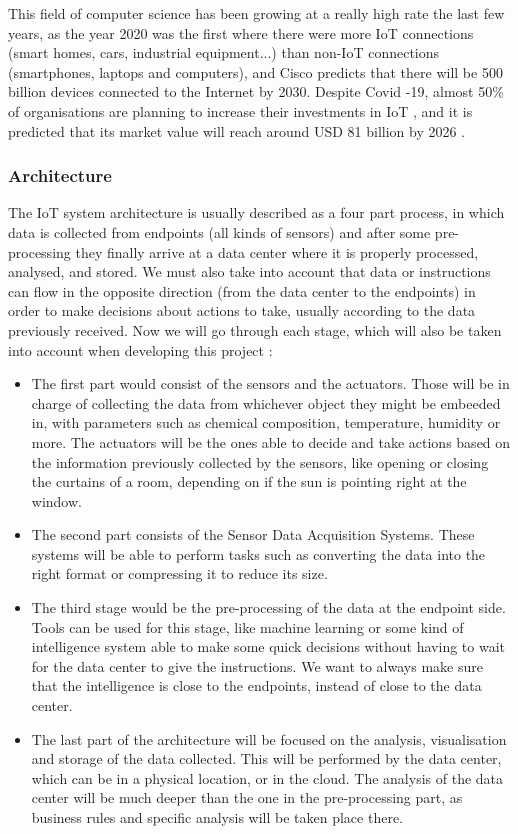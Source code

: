 \documentclass[12pt]{article}
\begin{document}
This field of computer science has been growing at a really high rate the last few years, as the year 2020 was the first where there were more IoT connections (smart homes, cars, industrial equipment...) than non-IoT connections (smartphones, laptops and computers), and Cisco predicts that there will be 500 billion devices connected to the Internet by 2030. Despite Covid -19, almost 50\% of organisations are planning to increase their investments in IoT \cite{gartner:covid}, and it is predicted that its market value will reach around USD 81 billion by 2026 \cite{mordor}.   

\subsubsection{Architecture}

The IoT system architecture is usually described as a four part process, in which data is collected from endpoints (all kinds of sensors) and after some pre-processing they finally arrive at a data center where it is properly processed, analysed, and stored. We must also take into account that data or instructions can flow in the opposite direction (from the data center to the endpoints) in order to make decisions about actions to take, usually according to the data previously received. Now we will go through each stage, which will also be taken into account when developing this project \cite{digi}\cite{marlabs}:

\begin{itemize}
    \item The first part would consist of the sensors and the actuators. Those will be in charge of collecting the data from whichever object they might be embeeded in, with parameters such as chemical composition, temperature, humidity or more. The actuators will be the ones able to decide and take actions based on the information previously collected by the sensors, like opening or closing the curtains of a room, depending on if the sun is pointing right at the window. 
    \item The second part consists of the Sensor Data Acquisition Systems. These systems will be able to perform tasks such as converting the data into the right format or compressing it to reduce its size.
    \item The third stage would be the pre-processing of the data at the endpoint side. Tools can be used for this stage, like machine learning or some kind of intelligence system able to make some quick decisions without having to wait for the data center to give the instructions. We want to always make sure that the intelligence is close to the endpoints, instead of close to the data center. 
    \item The last part of the architecture will be focused on the analysis, visualisation and storage of the data collected. This will be performed by the data center, which can be in a physical location, or in the cloud. The analysis of the data center will be much deeper than the one in the pre-processing part, as business rules and specific analysis will be taken place there.
\end{itemize}
\end{document}
